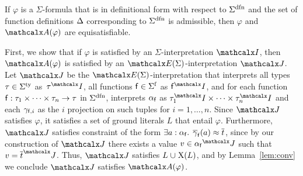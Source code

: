 \begin{theorem}\label{thm:equi}
If $\varphi$ is a\/ $\Sigma$-formula that is in definitional form with respect to\/
$\sfundefs{\Sigma}$
and the set of function definitions\/ $\DDD$ corresponding to\/
$\sfundefs{\Sigma}$ is admissible, then\/ $\varphi$ and\/ $\conv( \varphi )$ are
equisatisfiable.
\end{theorem}
\begin{longv}
\begin{proofsketch}
First, we show that if $\varphi$ is satisfied by an
$\Sigma$-interpretation $\I$, then $\conv( \varphi )$ is satisfied by an $\extendsig{\Sigma}$-interpretation $\J$.
Let $\J$ be the $\extendsig{\Sigma}$-interpretation that interprets all types $\tau \in \stypes{\Sigma}$ as~$\tau^\I$,
all functions $\con{f} \in \sfuns{\Sigma}$ as $\con{f}^\I$,
and for each function $\mathsf{f} : \tau_1 \times \cdots \times \tau_n \rightarrow \tau$ in $\sfundefs{\Sigma}$,
interprets $\alpha_{\mathsf{f}}$ as $\tau_1^\I \times \cdots \times \tau_n^\I$
and each $\gamma_{\mathsf{f},i}$ as the $i$ projection on such tuples for $i = 1, \ldots, n$.
Since $\J$ satisfies $\varphi$, it satisfies a set of ground literals $L$ that entail $\varphi$.
Furthermore, $\J$ satisfies  constraint of the form $\exists a : {\alpha_{\mathsf{f}}}.\;\, \overline{\gamma}_{\mathsf{f}}( a ) \approx \overline{t}$,
since by our construction of $\J$ there exists a value $v \in {\fargtype{\con{f}}}^\J$ such that $v = \vec t^\J$.
Thus, $\J$ satisfies $L \cup \absconstraints( L )$, and by Lemma~\ref{lem:conv}
we conclude $\J$ satisfies $\conv( \varphi )$.


\end{proofsketch}
\end{longv}
